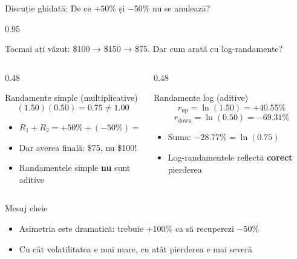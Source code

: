 \documentclass[9pt, aspectratio=169, t]{beamer}
\begin{document}
\begin{frame}[shrink=3]{Discuție ghidată: De ce $+50\%$ și $-50\%$ nu se anulează?}
    \begin{cminipage}{0.95\textwidth}
    \begin{alertblock}{Tocmai ați văzut: \$100 → \$150 → \$75. Dar cum arată cu log-randamente?}
    \end{alertblock}
    \vspace{0.2cm}
    \begin{columns}[T]
    \begin{column}{0.48\textwidth}
    \begin{block}{Randamente simple (multiplicative)}
    \[
    (1.50)(0.50) = 0.75 \neq 1.00
    \]
    \begin{itemize}\setlength{\itemsep}{0pt}
        \item $R_1 + R_2 = +50\% + (-50\%) = 0\%$
        \item Dar averea finală: \$75, nu \$100!
        \item Randamentele simple \textbf{nu} sunt aditive
    \end{itemize}
    \end{block}
    \end{column}
    \begin{column}{0.48\textwidth}
    \begin{exampleblock}{Randamente log (aditive)}
    \[
    r_{\text{up}} = \ln(1.50) = +40.55\%
    \]
    \[
    r_{\text{down}} = \ln(0.50) = -69.31\%
    \]
    \begin{itemize}\setlength{\itemsep}{0pt}
        \item Suma: $-28.77\% = \ln(0.75)$ \checkmark
        \item Log-randamentele reflectă \textbf{corect} pierderea
    \end{itemize}
    \end{exampleblock}
    \end{column}
    \end{columns}
    \vspace{0.2cm}
    \begin{alertblock}{Mesaj cheie}
    \begin{itemize}\setlength{\itemsep}{0pt}
        \item Asimetria este dramatică: trebuie $+100\%$ ca să recuperezi $-50\%$
        \item Cu cât volatilitatea e mai mare, cu atât pierderea e mai severă
    \end{itemize}
    \end{alertblock}
    \end{cminipage}
\end{frame}
\end{document}
